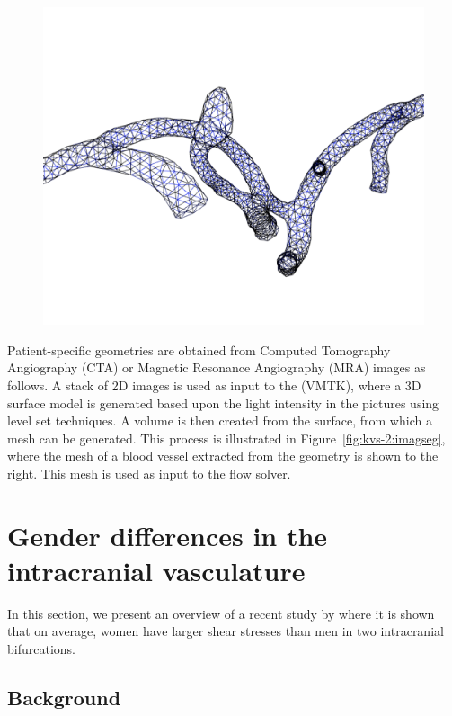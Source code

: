 \begin{figure}
{            \includegraphics[width=\threefigsfull]{chapters/kvs-2/pdf/viper3.pdf}}
\end{figure}

Patient-specific geometries are obtained from Computed Tomography
Angiography (CTA) or Magnetic Resonance Angiography (MRA) images as
follows. A stack of 2D images is used as input to the \citet{vmtk} (VMTK),
where a 3D surface model is generated based upon the light intensity
in the pictures using level set techniques. A volume is then created
from the surface, from which a mesh can be generated. This process is
illustrated in Figure~\ref{fig:kvs-2:imagseg}, where the mesh of a
blood vessel extracted from the geometry is shown to the right. This
mesh is used as input to the flow solver.

\section{Gender differences in the intracranial vasculature} \label{gender}

In this section, we present an overview of a recent study
by \citet{LindekleivValen-SendstadMorganEtAl2010} where it is shown
that on average, women have larger shear stresses than men in two
intracranial bifurcations.

\subsection{Background}


